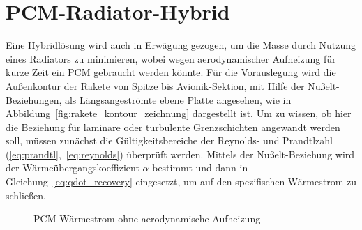 \section{PCM-Radiator-Hybrid}\label{sec:pcm_radiator_hybrid}

Eine Hybridlösung wird auch in Erwägung gezogen, um die Masse durch Nutzung eines Radiators zu minimieren, wobei wegen aerodynamischer Aufheizung für kurze Zeit ein PCM gebraucht werden könnte.
Für die Vorauslegung wird die Außenkontur der Rakete von Spitze bis Avionik-Sektion, mit Hilfe der Nußelt-Beziehungen, als Längsangeströmte ebene Platte angesehen,
wie in Abbildung~\ref{fig:rakete_kontour_zeichnung} dargestellt ist.
Um zu wissen, ob hier die Beziehung für laminare oder turbulente Grenzschichten angewandt werden soll, müssen zunächst die Gültigkeitsbereiche der Reynolds- und Prandtlzahl (\ref{eq:prandtl},~\ref{eq:reynolds}) überprüft werden.
Mittels der Nußelt-Beziehung wird der Wärmeübergangskoeffizient $\alpha$ bestimmt und dann in Gleichung~\ref{eq:qdot_recovery} eingesetzt, um auf den spezifischen Wärmestrom zu schließen.

\begin{figure}[H]
  \centering
  \caption{PCM Wärmestrom ohne aerodynamische Aufheizung}\label{fig:pcm_waermestrom_diagramm}
\end{figure}

